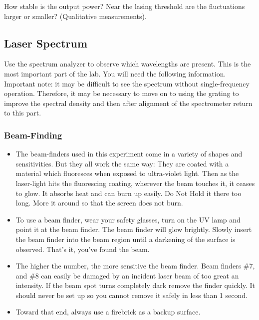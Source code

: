 \documentclass{../lab}
\begin{document}
How stable is the output power? Near the lasing threshold are the fluctuations larger or smaller? (Qualitative measurements).

\subsection{Laser Spectrum}

Use the spectrum analyzer to observe which wavelengths are present. This is the most important part of the lab. You will need the following information. Important note: it may be difficult to see the spectrum without single-frequency operation. Therefore, it may be necessary to move on to using the grating to improve the spectral density and then after alignment of the spectrometer return to this part.

\subsubsection{Beam-Finding}

\begin{itemize}
    \item The beam-finders used in this experiment come in a variety of shapes and sensitivities. But they all work the same way: They are coated with a material which fluoresces when exposed to ultra-violet light. Then as the laser-light hits the fluorescing coating, wherever the beam touches it, it ceases to glow. It absorbs heat and can burn up easily. Do Not Hold it there too long. More it around so that the screen does not burn.

    \item To use a beam finder, wear your safety glasses, turn on the UV lamp and point it at the beam finder. The beam finder will glow brightly. Slowly insert the beam finder into the beam region until a darkening of the surface is observed. That's it, you've found the beam.

    \item The higher the number, the more sensitive the beam finder. Beam finders \#7, and \#8 can easily be damaged by an incident laser beam of too great an intensity. If the beam spot turns completely dark remove the finder quickly. It should never be set up so you cannot remove it safely in less than 1 second.

    \item Toward that end, always use a firebrick as a backup surface.
\end{itemize}
\end{document}
